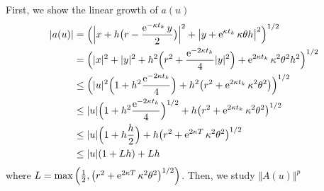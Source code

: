First, we show the linear growth of $a(u)$
\begin{equation*}
	\begin{aligned}
		\vert a(u) \vert
		 & = \Big( \Big\vert x + h \big(r - \frac{\operatorname{e}^{- \kappa t_k} y}{2} \big) \Big\vert^2 + \big\vert y + \operatorname{e}^{\kappa t_k} \kappa \theta h \big\vert^2 \Big)^{1/2}              \\
		 & = \Big( \vert x \vert^2 + \vert y \vert^2 + h^2 \Big( r^2 + \frac{\operatorname{e}^{- 2 \kappa t_k}}{4} \vert y \vert^2 \Big) + \operatorname{e}^{2 \kappa t_k} \kappa^2 \theta^2 h^2 \Big)^{1/2} \\
		 & \leq \Big( \vert u \vert^2 \Big( 1 + h^2 \frac{\operatorname{e}^{- 2 \kappa t_k}}{4} \Big) + h^2 \big( r^2 + \operatorname{e}^{2 \kappa t_k} \kappa^2 \theta^2 \big) \Big)^{1/2}                  \\
		 & \leq \vert u \vert \Big( 1 + h^2 \frac{\operatorname{e}^{- 2 \kappa t_k}}{4} \Big)^{1/2} + h \big( r^2 + \operatorname{e}^{2 \kappa t_k} \kappa^2 \theta^2 \big)^{1/2}                            \\
		 & \leq \vert u \vert \Big( 1 + h \frac{h}{2} \Big) + h \big( r^2 + \operatorname{e}^{2 \kappa T} \kappa^2 \theta^2 \big)^{1/2}                                                        \\
		 & \leq \vert u \vert ( 1 + L h ) + L h
	\end{aligned}
\end{equation*}
where $L = \max \Big( \frac{1}{2} , \big( r^2 + \operatorname{e}^{2 \kappa T} \kappa^2 \theta^2 \big)^{1/2} \Big)$. Then, we study $\Vert A(u) \Vert^p$
